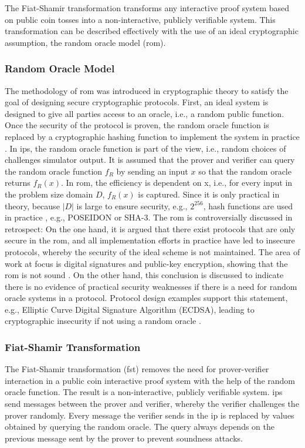 The Fiat-Shamir transformation transforms any interactive proof system based on public coin tosses into a non-interactive, publicly verifiable system. This transformation can be described effectively with the use of an ideal cryptographic assumption, the random oracle model (\acrshort{rom}). 
\subsubsection{Random Oracle Model}
The methodology of \acrshort{rom} was introduced in cryptographic theory to satisfy the goal of designing secure cryptographic protocols. First, an ideal system is designed to give all parties access to an oracle, i.e., a random public function. Once the security of the protocol is proven, the random oracle function is replaced by a cryptographic hashing function to implement the system in practice \citep{ROMBellare}. In \acrshort{ip}s, the random oracle function is part of the view, i.e., random choices of challenges simulator output. It is assumed that the prover and verifier can query the random oracle function \(f_R\) by sending an input \(x\) so that the random oracle returns \(f_R(x)\). In \acrshort{rom}, the efficiency is dependent on x, i.e., for every input in the problem size domain \(D\), \(f_R(x)\) is captured. Since it is only practical in theory, because \(|D|\) is large to ensure security, e.g., \(2^{256}\), hash functions are used in practice \citep{ROMBellare, Thaler}, e.g., POSEIDON or SHA-3. The \acrshort{rom} is controversially discussed in retrospect: On the one hand, it is argued that there exist protocols that are only secure in the \acrshort{rom}, and all implementation efforts in practice have led to insecure protocols, whereby the security of the ideal scheme is not maintained. The area of work at focus is digital signatures and public-key encryption, showing that the \acrshort{rom} is not sound \citep{ROMCanetti}. On the other hand, this conclusion is discussed to indicate there is no evidence of practical security weaknesses if there is a need for random oracle systems in a protocol. Protocol design examples support this statement, e.g., Elliptic Curve Digital Signature Algorithm (ECDSA), leading to cryptographic insecurity if not using a random oracle \citep{ROMretroKoblitz}. 
\subsubsection{Fiat-Shamir Transformation}
The Fiat-Shamir transformation (\acrshort{fst}) \citep{ROMFiat1986HowTP} removes the need for prover-verifier interaction in a public coin interactive proof system with the help of the random oracle function. The result is a non-interactive, publicly verifiable system. \acrshort{ip}s send messages between the prover and verifier, whereby the verifier challenges the prover randomly. Every message the verifier sends in the \acrshort{ip} is replaced by values obtained by querying the random oracle. The query always depends on the previous message sent by the prover to prevent soundness attacks.

